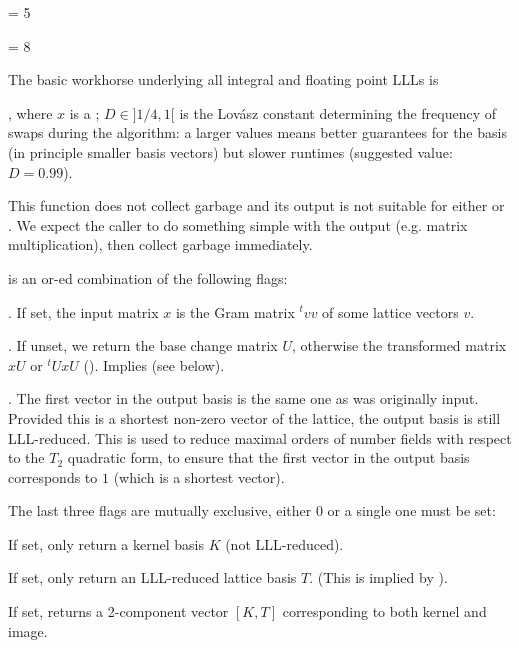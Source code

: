  \fl = 5

 \fl = 8

\smallskip

The basic workhorse underlying all integral and floating point LLLs is

, where $x$ is a ;
$D \in ]1/4,1[$ is the Lov\'{a}sz constant determining the frequency of
swaps during the algorithm: a larger values means better guarantees for the
basis (in principle smaller basis vectors) but slower runtimes (suggested
value: $D = 0.99$).

 This function does not collect garbage and its output
is not suitable for either  or . We expect
the caller to do something simple with the output (e.g. matrix
multiplication), then collect garbage immediately.

\noindent{} is an or-ed combination of the following flags:

\item  {}. If set, the input matrix $x$ is the Gram matrix ${}^t
v v$ of some lattice vectors $v$.

\item  {}. If unset, we return the base change matrix $U$,
otherwise the transformed matrix $x U$ or ${}^t U x U$ ().
Implies  (see below).

\item  {}. The first vector in the output basis is the same
one as was originally input. Provided this is a shortest non-zero vector of
the lattice, the output basis is still LLL-reduced. This is used to reduce
maximal orders of number fields with respect to the $T_2$ quadratic form, to
ensure that the first vector in the output basis corresponds to $1$ (which is
a shortest vector).

The last three flags are mutually exclusive, either 0 or a single one must be
set:

\item  {} If set, only return a kernel basis $K$ (not LLL-reduced).

\item  {} If set, only return an LLL-reduced lattice basis $T$.
(This is implied by ).

\item  {} If set, returns a 2-component vector $[K, T]$
corresponding to both kernel and image.


